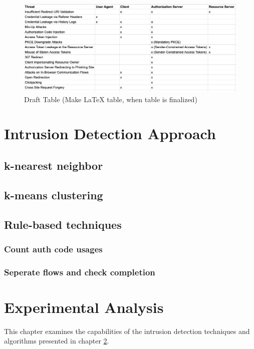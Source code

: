 \documentclass[
    fontsize=12pt,
    headings=small,
    parskip=half,           %
    bibliography=totoc,
    numbers=noenddot,       %
    open=any,               %
    ]{scrreprt}
\begin{document}
\begin{figure}[!htb]
	\sffamily\footnotesize
	\includegraphics[width=1\textwidth]{pic/threats.png}
	\unitlength=0.75mm
	\linethickness{0.4pt}
	\caption{Draft Table (Make LaTeX table, when table is finalized)}
	\label{fig:threats_by_mitigation}
\end{figure}



\chapter{Intrusion Detection Approach}

\section{k-nearest neighbor}

\section{k-means clustering}

\section{Rule-based techniques}
\subsection{Count auth code usages}
\subsection{Seperate flows and check completion}


\chapter{Experimental Analysis}
\label{chap:exp}
This chapter examines the capabilities of the intrusion detection techniques and algorithms presented in chapter \ref{chap:exp}.
\end{document}
